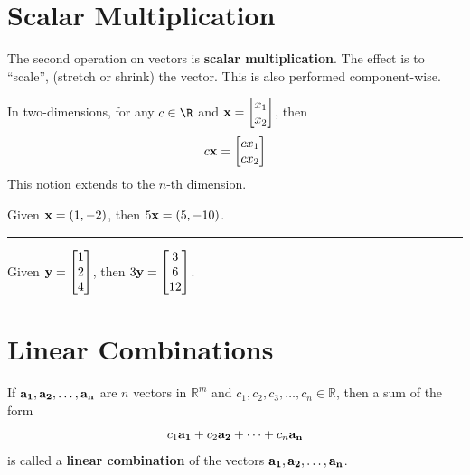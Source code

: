 \section{Scalar Multiplication}
The second operation on vectors is \textbf{scalar multiplication}.  The effect is to ``scale'', (stretch or shrink) the vector.  This is also performed component-wise.


\begin{tcolorbox}[colback=yellow!10!,colframe=gray!15!]
\begin{definition}
In two-dimensions, for any $c \in \R$ and ${\bf x} = \begin{bmatrix}
	x_1 \\ x_2
		\end{bmatrix}$, then 
\[  c{\bf x} = \begin{bmatrix}
	cx_1 \\ cx_2
		\end{bmatrix} \]
This notion extends to the $n$-th dimension.  
  
\end{definition}	 
\end{tcolorbox} 

\begin{example}
	Given ${\bf x} = (1,-2)$, then $5{\bf x} = (5, -10)$. 
\end{example}



\rule[0.01in]{\textwidth}{0.0025in}




\begin{example}
	Given ${\bf y} = \begin{bmatrix}
	1 \\ 2 \\ 4
		\end{bmatrix}$, then $3{\bf y} = \begin{bmatrix}
	3 \\ 6 \\ 12
		\end{bmatrix}$. 
\end{example}




%
%
\section{Linear Combinations}

\begin{tcolorbox}[colback=yellow!10!,colframe=gray!15!]
\begin{definition}
If ${\bf a_1}, {\bf a_2}, \dots, {\bf a_n}$ are $n$ vectors in $\mathbb{R}^m$ and $c_1, c_2, c_3, \dots, c_n \in \mathbb{R}$, then a sum of the form
\[  c_1 {\bf a_1} + c_2 {\bf a_2} + \cdots + c_n {\bf a_n} \]
is called a \textbf{linear combination} of the vectors ${\bf a_1}, {\bf a_2}, \dots, {\bf a_n}$.
  
\end{definition}	 
\end{tcolorbox} 




